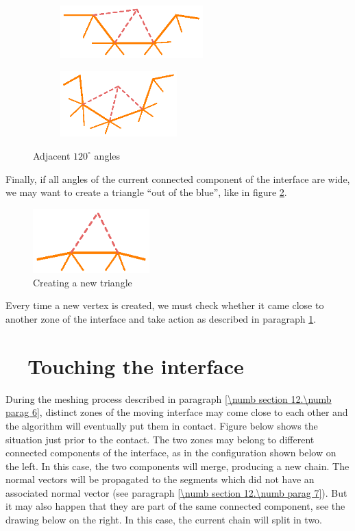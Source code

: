 \begin{figure}[ht] \centering
\begin{subfigure}{60mm}\centering
  \includegraphics[width=55mm]{fill-angle-120-a}
\end{subfigure}  
\begin{subfigure}{50mm}\centering
  \includegraphics[width=45mm]{fill-angle-120-b}
\end{subfigure}  
  \caption{Adjacent $ 120^\circ $ angles}
  \label{\numb section 12.\numb fig 5}
\end{figure}

Finally, if all angles of the current connected component of the interface are wide,
we may want to create a triangle ``out of the blue'', like in figure
\ref{\numb section 12.\numb fig 6}.

\begin{figure}[ht] \centering
  \includegraphics[width=45mm]{fill-blue}
  \caption{Creating a new triangle}
  \label{\numb section 12.\numb fig 6}
\end{figure}

Every time a new vertex is created, we must check whether it came close to another
zone of the interface and take action as described in paragraph
\ref{\numb section 12.\numb parag 9}.


\section{~~Touching the interface}\label{\numb section 12.\numb parag 9}

During the meshing process described in paragraph \ref{\numb section 12.\numb parag 6},
distinct zones of the moving interface may
come close to each other and the algorithm will eventually put them in contact.
Figure below shows the situation just prior to the contact.
The two zones may belong to different connected components of the interface,
as in the configuration shown below on the left.
In this case, the two components will merge, producing a new chain.
The normal vectors will be propagated to the segments which did not have an associated
normal vector (see paragraph \ref{\numb section 12.\numb parag 7}).
But it may also happen that they are part of the same connected component,
see the drawing below on the right.
In this case, the current chain will split in two.

